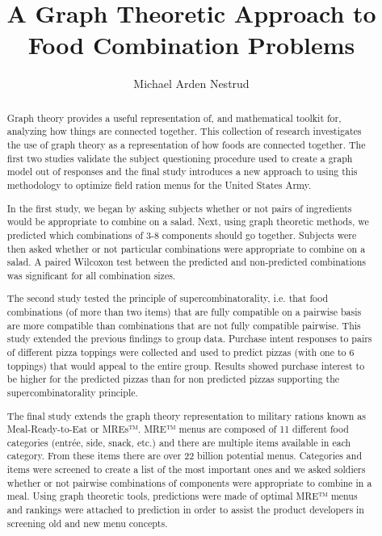 \documentclass[phd,tocprelim]{cornell}
\title {A Graph Theoretic Approach to Food Combination Problems}
\author {Michael Arden Nestrud}
\begin{document}
\maketitle
{}
\makecopyright
{}
\begin{abstract}

Graph theory provides a useful representation of, and mathematical toolkit for, analyzing how things are connected together.  This collection of research investigates the use of graph theory as a representation of how foods are connected together.  The first two studies validate the subject questioning procedure used to create a graph model out of responses and the final study introduces a new approach to using this methodology to optimize field ration menus for the United States Army.

In the first study, we began by asking subjects whether or not pairs of ingredients would be appropriate to combine on a salad. Next, using graph theoretic methods, we predicted which combinations of 3-8 components should go together.  Subjects were then asked whether or not particular combinations were appropriate to combine on a salad. A paired Wilcoxon test between the predicted and non-predicted combinations was significant for all combination sizes.

The second study tested the principle of supercombinatorality, i.e. that food combinations (of more than two items) that are fully compatible on a pairwise basis are more compatible than combinations that are not fully compatible pairwise. This study extended the previous findings to group data. Purchase intent responses to pairs of different pizza toppings were collected and used to predict pizzas (with one to 6 toppings) that would appeal to the entire group. Results showed purchase interest to be higher for the predicted pizzas than for non predicted pizzas supporting the supercombinatorality principle. 

The final study extends the graph theory representation to military rations known as Meal-Ready-to-Eat or MREs™.  MRE™ menus are composed of 11 different food categories (entr\'{e}e, side, snack, etc.) and there are multiple items available in each category.  From these items there are over 22 billion potential menus.  Categories and items were screened to create a list of the most important ones and we asked soldiers whether or not pairwise combinations of components were appropriate to combine in a meal.  Using graph theoretic tools, predictions were made of optimal MRE™ menus and rankings were attached to prediction in order to assist the product developers in screening old and new menu concepts. 
\end{abstract}
\end{document}
